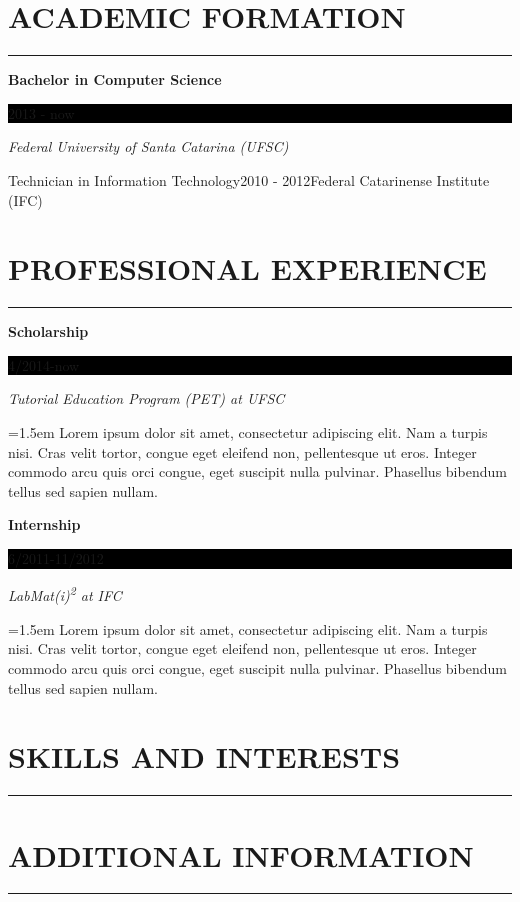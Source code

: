 \documentclass{article}
\newcommand{\sectiontitle}[1]{\section*{\uppercase{#1}} \hrule \vspace{1em}}
\newcommand{\formationentry}[4]{
	\noindent \textbf{#1} \hfill
	\colorbox{black}{
		\parbox[c][1em]{8em}{
			\hfill \color{white} #2
		}
	} \par
	\noindent \textit{#3} \par
	\normalsize
	\vspace{1em}
}
\newcommand{\experienceentry}[4]{
	\noindent \textbf{#1} \hfill
	\colorbox{black}{
		\parbox[c][1em]{8em}{
			\hfill \color{white} #2
		}
	} \par
	\noindent \textit{#3} \par
	\noindent \hangindent=1.5em \hangafter=0 \small #4 \par
	\normalsize
	\vspace{1em}
}
\newenvironment{main}{
\begin{minipage}[t]{0.75\textwidth}
}{
\end{minipage}
}
\begin{document}
\hspace{1em} \vrule \hspace{1em}
\begin{main}
\sectiontitle{Academic Formation}
\formationentry{Bachelor in Computer Science}{2013 - now}{Federal University
of Santa Catarina (UFSC)}

\formationentry{Technician in Information Technology}{2010 - 2012}{Federal
Catarinense Institute (IFC)}


\sectiontitle{Professional Experience}
\experienceentry{Scholarship}{4/2014-now}{Tutorial Education Program (PET) at
UFSC}{Lorem ipsum dolor sit amet, consectetur adipiscing elit. Nam a turpis
nisi. Cras velit tortor, congue eget eleifend non, pellentesque ut eros.
Integer commodo arcu quis orci congue, eget suscipit nulla pulvinar.
Phasellus bibendum tellus sed sapien nullam.}

\experienceentry{Internship}{6/2011-11/2012}{LabMat(i)\textsuperscript{2} at
IFC}{Lorem ipsum dolor sit amet, consectetur adipiscing elit. Nam a turpis
nisi. Cras velit tortor, congue eget eleifend non, pellentesque ut eros.
Integer commodo arcu quis orci congue, eget suscipit nulla pulvinar.
Phasellus bibendum tellus sed sapien nullam.}


\sectiontitle{Skills and Interests}


\sectiontitle{Additional Information}


\end{main}
\end{document}
